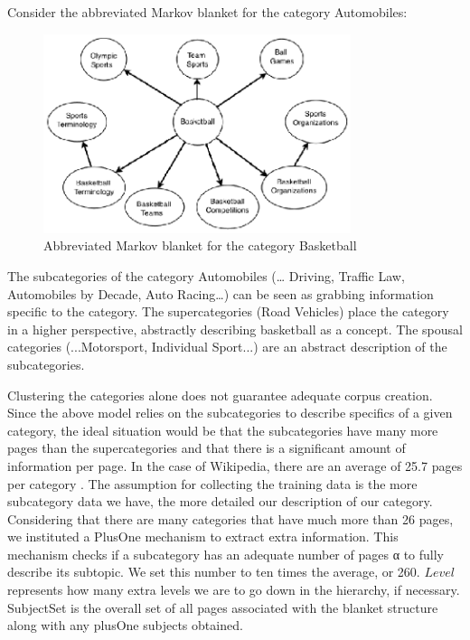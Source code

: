 Consider the abbreviated Markov blanket for the category Automobiles:  



\begin{figure}[t]
\centering
\includegraphics[width=90mm]{abbrv_bb_blanket.eps}
\caption{Abbreviated Markov blanket for the category Basketball}
\label{fig:abbrv_bb_blanket}
\end{figure}

The subcategories of the category Automobiles (… Driving, Traffic Law, Automobiles by Decade, Auto Racing…) can be seen as grabbing information specific to the category. The supercategories (Road Vehicles) place the category in a higher perspective, abstractly describing basketball as a concept. The spousal categories (...Motorsport, Individual Sport...) are an abstract description of the subcategories. 

Clustering the categories alone does not guarantee adequate corpus creation. Since the above model relies on the subcategories to describe specifics of a given category, the ideal situation would be that the subcategories have many more pages than the supercategories and that there is a significant amount of information per page. 
In the case of Wikipedia, there are an average of 25.7 pages per category \cite{1321474}. The assumption for collecting the training data is the more subcategory data we have, the more detailed our description of our category. Considering that there are many categories that have much more than 26 pages, we instituted a PlusOne mechanism to extract extra information. This mechanism checks if a subcategory has an adequate number of pages α to fully describe its subtopic. We set this number to ten times the average, or 260. $Level$ represents how many extra levels we are to go down in the hierarchy, if necessary. SubjectSet is the overall set of all pages associated with the blanket structure along with any plusOne subjects obtained. 

